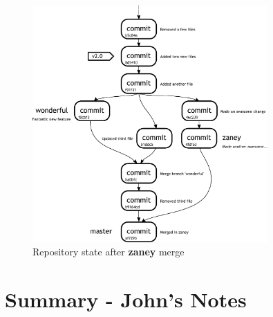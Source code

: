 \begin{figure}[hbt]
\centering
\includegraphics[width=9cm]{images/f-w4-d6.pdf}
\caption{Repository state after \textbf{zaney} merge}
\end{figure}


\clearpage

\section{Summary - John's Notes}
